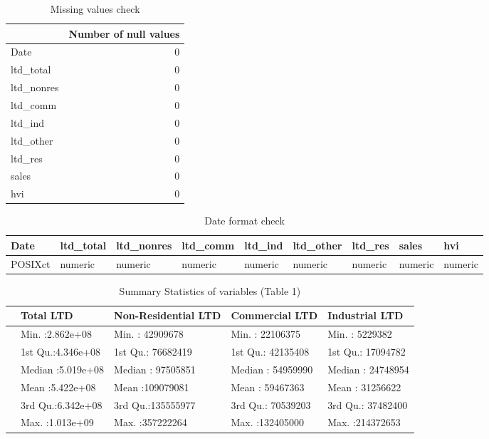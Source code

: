 \documentclass[11pt,a4paper,]{article}
\begin{document}
\begin{table}

\caption{\label{tab:missingval}Missing values check}
\centering
\begin{tabular}[t]{lr}
\toprule
  & Number of null values\\
\midrule
Date & 0\\
ltd\_total & 0\\
ltd\_nonres & 0\\
ltd\_comm & 0\\
ltd\_ind & 0\\
\addlinespace
ltd\_other & 0\\
ltd\_res & 0\\
sales & 0\\
hvi & 0\\
\bottomrule
\end{tabular}
\end{table}

\begin{table}

\caption{\label{tab:dataformat}Date format check}
\centering
\begin{tabular}[t]{lllllllll}
\toprule
Date & ltd\_total & ltd\_nonres & ltd\_comm & ltd\_ind & ltd\_other & ltd\_res & sales & hvi\\
\midrule
POSIXct & numeric & numeric & numeric & numeric & numeric & numeric & numeric & numeric\\
\bottomrule
\end{tabular}
\end{table}

\begin{table}

\caption{\label{tab:statsumone}Summary Statistics of variables (Table 1)}
\centering
\begin{tabular}[t]{lllll}
\toprule
  & Total LTD & Non-Residential LTD & Commercial LTD & Industrial LTD\\
\midrule
 & Min.   :2.862e+08 & Min.   : 42909678 & Min.   : 22106375 & Min.   :  5229382\\
 & 1st Qu.:4.346e+08 & 1st Qu.: 76682419 & 1st Qu.: 42135408 & 1st Qu.: 17094782\\
 & Median :5.019e+08 & Median : 97505851 & Median : 54959990 & Median : 24748954\\
 & Mean   :5.422e+08 & Mean   :109079081 & Mean   : 59467363 & Mean   : 31256622\\
 & 3rd Qu.:6.342e+08 & 3rd Qu.:135555977 & 3rd Qu.: 70539203 & 3rd Qu.: 37482400\\
\addlinespace
 & Max.   :1.013e+09 & Max.   :357222264 & Max.   :132405000 & Max.   :214372653\\
\bottomrule
\end{tabular}
\end{table}
\end{document}
